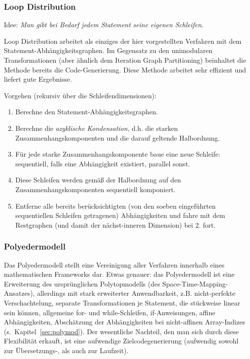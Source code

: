 \subsubsection{Loop Distribution}

Idee: \textit{Man gibt bei Bedarf jedem Statement seine eigenen
  Schleifen}.

Loop Distribution arbeitet als einziges der hier vorgestellten Verfahren
mit dem Statement-Abhängigkeitsgraphen. Im Gegensatz zu den unimodularen
Transformationen (aber ähnlich dem Iteration Graph Partitioning)
beinhaltet die Methode bereits die Code-Generierung. Diese Methode
arbeitet sehr effizient und liefert gute Ergebnisse.

Vorgehen (rekursiv über die Schleifendimensionen):\\[-3ex]
\begin{enumerate}
\item Berechne den Statement-Abhängigkeitsgraphen.\\[-4ex]
\item Berechne die \emph{azyklische Kondensation}, d.h. die starken
  Zusammenhangskomponenten und die darauf geltende Halbordnung.\\[-4ex]
\item Für jede starke Zusammenhangskomponente baue eine neue Schleife:
  sequentiell, falls eine Abhängigkeit existiert, parallel sonst.\\[-4ex]
\item Diese Schleifen werden gemäß der Halbordnung auf den
  Zusammenhangskomponenten sequentiell komponiert.\\[-4ex]
\item Entferne alle bereits berücksichtigten (von den soeben
  eingeführten sequentiellen Schleifen getragenen) Abhängigkeiten und
  fahre mit dem Restgraphen (und damit der nächst-inneren Dimension) bei
  2. fort.
\end{enumerate}

\subsubsection{Polyedermodell}

Das Polyedermodell stellt eine Vereinigung aller Verfahren innerhalb
eines mathematischen Frameworks dar. Etwas genauer: das Polyedermodell
ist eine Erweiterung des ursprünglichen Polytopmodells (des
Space-Time-Mapping-Ansatzes), allerdings mit stark erweiterter
Anwendbarkeit, z.B.  nicht-perfekte Verschachtelung, separate
Transformationen je Statement, die stückweise linear sein können,
allgemeine {\sffamily for}- und {\sffamily while}-Schleifen, {\sffamily if}-Anweisungen,
affine Abhängigkeiten, Ab\-schät\-zung der Abhängigkeiten bei nicht-affinen
Array-Indizes (s.~Kapitel~\ref{sec:polymod}). Der wesentliche Nachteil,
den man sich durch diese Flexibilität erkauft, ist eine aufwendige
Zielcodegenerierung (aufwendig sowohl zur Übersetzungs-, als auch zur
Laufzeit).
